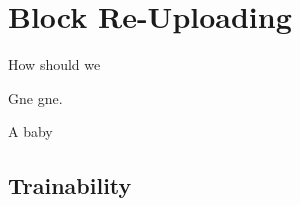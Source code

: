 
\chapter{Block Re-Uploading}
 
How should we

\epigraph{Gne gne.}{A baby}

\section{Trainability}

